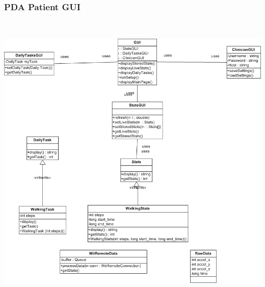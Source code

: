 \documentclass{article}
\begin{document}
\subsubsection{PDA Patient GUI}

\begin{center}
\includegraphics[width=6in,height=5.71in]{PDA_Patient_GUI.png}
\end{center}
\end{document}

